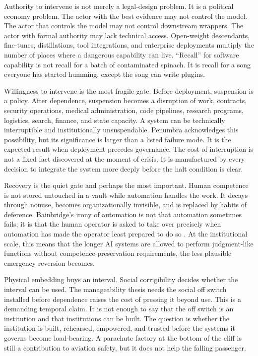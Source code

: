 \documentclass[11pt]{article}
\begin{document}
Authority to intervene is not merely a legal-design problem. It is a political economy problem. The actor with the best evidence may not control the model. The actor that controls the model may not control downstream wrappers. The actor with formal authority may lack technical access. Open-weight descendants, fine-tunes, distillations, tool integrations, and enterprise deployments multiply the number of places where a dangerous capability can live. ``Recall'' for software capability is not recall for a batch of contaminated spinach. It is recall for a song everyone has started humming, except the song can write plugins.

Willingness to intervene is the most fragile gate. Before deployment, suspension is a policy. After dependence, suspension becomes a disruption of work, contracts, security operations, medical administration, code pipelines, research programs, logistics, search, finance, and state capacity. A system can be technically interruptible and institutionally unsuspendable. Penumbra acknowledges this possibility, but its significance is larger than a listed failure mode. It is the expected result when deployment precedes governance. The cost of interruption is not a fixed fact discovered at the moment of crisis. It is manufactured by every decision to integrate the system more deeply before the halt condition is clear.

Recovery is the quiet gate and perhaps the most important. Human competence is not stored untouched in a vault while automation handles the work. It decays through nonuse, becomes organizationally invisible, and is replaced by habits of deference. Bainbridge's irony of automation is not that automation sometimes fails; it is that the human operator is asked to take over precisely when automation has made the operator least prepared to do so \citep{bainbridge1983}. At the institutional scale, this means that the longer AI systems are allowed to perform judgment-like functions without competence-preservation requirements, the less plausible emergency reversion becomes.

Physical embedding buys an interval. Social corrigibility decides whether the interval can be used. The manageability thesis needs the social off switch installed before dependence raises the cost of pressing it beyond use. This is a demanding temporal claim. It is not enough to say that the off switch is an institution and that institutions can be built. The question is whether the institution is built, rehearsed, empowered, and trusted before the systems it governs become load-bearing. A parachute factory at the bottom of the cliff is still a contribution to aviation safety, but it does not help the falling passenger.
\end{document}
